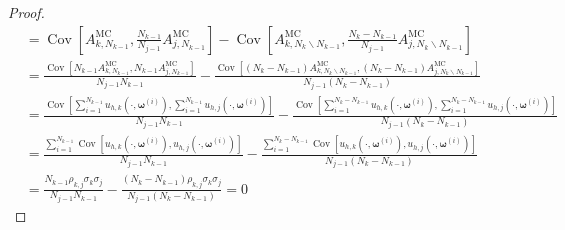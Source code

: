 \begin{proof}
\begin{align*}
    &=\operatorname{Cov}\left[A_{k,N_{k-1}}^{\text{MC}}, \frac{N_{k-1}}{N_{j-1}}A_{j,N_{k-1}}^{\text{MC}}\right]-\operatorname{Cov}\left[ A_{k,N_{k}\backslash N_{k-1}}^{\text{MC}}, \frac{N_k - N_{k-1}}{N_{j-1}} A_{j,N_{k}\backslash N_{k-1}}^{\text{MC}} \right]\\
    &=\frac{\operatorname{Cov}\left[N_{k-1}A_{k,N_{k-1}}^{\text{MC}}, N_{k-1} A_{j,N_{k-1}}^{\text{MC}}\right]}{N_{j-1}N_{k-1}}-\frac{\operatorname{Cov}\left[(N_k-N_{k-1}) A_{k,N_{k}\backslash N_{k-1}}^{\text{MC}}, (N_k - N_{k-1}) A_{j,N_{k}\backslash N_{k-1}}^{\text{MC}} \right]}{N_{j-1}(N_k-N_{k-1})}\\
    &=\frac{\operatorname{Cov}\left[\sum_{i=1}^{N_{k-1}}u_{h,k}\left(\cdot, \boldsymbol{\omega}^{(i)}\right),\sum_{i=1}^{N_{k-1}}u_{h,j}\left(\cdot, \boldsymbol{\omega}^{(i)}\right)\right]}{N_{j-1}N_{k-1}}
    -\frac{\operatorname{Cov}\left[\sum_{i=1}^{N_k-N_{k-1}}u_{h,k}\left(\cdot, \boldsymbol{\omega}^{(i)}\right), \sum_{i=1}^{N_k-N_{k-1}}u_{h,j}\left(\cdot, \boldsymbol{\omega}^{(i)}\right)\right]}{N_{j-1}(N_k-N_{k-1})}\\
    &=\frac{\sum_{i=1}^{N_{k-1}}\operatorname{Cov}\left[u_{h,k}\left(\cdot, \boldsymbol{\omega}^{(i)}\right),u_{h,j}\left(\cdot, \boldsymbol{\omega}^{(i)}\right)\right]}{N_{j-1}N_{k-1}} -\frac{\sum_{i=1}^{N_k-N_{k-1}}\operatorname{Cov}\left[u_{h,k}\left(\cdot, \boldsymbol{\omega}^{(i)}\right), u_{h,j}\left(\cdot, \boldsymbol{\omega}^{(i)}\right)\right]}{N_{j-1}(N_k-N_{k-1})}\\
    &=\frac{N_{k-1}\rho_{k,j}\sigma_k\sigma_j}{N_{j-1}N_{k-1}}-\frac{(N_k-N_{k-1})\rho_{k,j}\sigma_k\sigma_j}{N_{j-1}(N_k-N_{k-1})}=0
\end{align*}
\end{proof}



